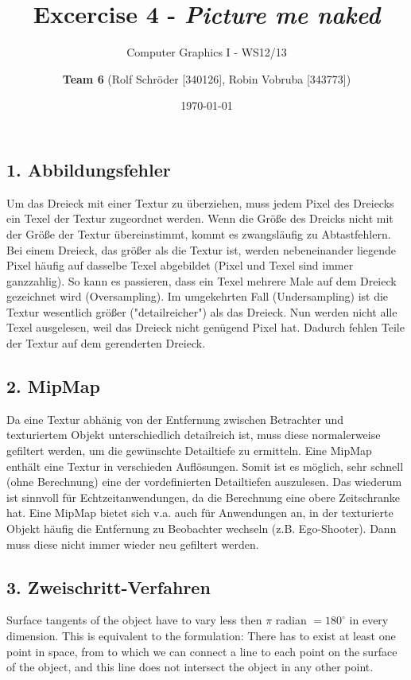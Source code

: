 \documentclass[a4paper,headings=small]{scrartcl}
\title{Excercise 4 - \emph{Picture me naked}}
\subtitle{Computer Graphics I - WS12/13}
\author{\textbf{Team 6} (Rolf Schröder [340126], Robin Vobruba [343773])}
\date{\today}
\numberwithin{equation}{section} %
\numberwithin{figure}{section}   %
\begin{document}
\maketitle

\subsection*{1. Abbildungsfehler}
Um das Dreieck mit einer Textur zu überziehen, muss jedem Pixel des Dreiecks ein Texel der Textur zugeordnet werden.
Wenn die Größe des Dreicks nicht mit der Größe der Textur übereinstimmt, kommt es zwangsläufig zu Abtastfehlern.
Bei einem Dreieck, das größer als die Textur ist, werden nebeneinander liegende Pixel häufig auf dasselbe Texel abgebildet (Pixel und Texel sind immer ganzzahlig).
So kann es passieren, dass ein Texel mehrere Male auf dem Dreieck gezeichnet wird (Oversampling).
Im umgekehrten Fall (Undersampling) ist die Textur wesentlich größer ("detailreicher") als das Dreieck.
Nun werden nicht alle Texel ausgelesen, weil das Dreieck nicht genügend Pixel hat.
Dadurch fehlen Teile der Textur auf dem gerenderten Dreieck.

\subsection*{2. MipMap}
Da eine Textur abhänig von der Entfernung zwischen Betrachter und texturiertem Objekt unterschiedlich detailreich ist, muss diese normalerweise gefiltert werden, um die gewünschte Detailtiefe zu ermitteln.
Eine MipMap enthält eine Textur in verschieden Auflösungen.
Somit ist es möglich, sehr schnell (ohne Berechnung) eine der vordefinierten Detailtiefen auszulesen.
Das wiederum ist sinnvoll für Echtzeitanwendungen, da die Berechnung eine obere Zeitschranke hat.
Eine MipMap bietet sich v.a. auch für Anwendungen an, in der texturierte Objekt häufig die Entfernung zu Beobachter wechseln (z.B. Ego-Shooter).
Dann muss diese nicht immer wieder neu gefiltert werden.

\subsection*{3. Zweischritt-Verfahren}
Surface tangents of the object have to vary less then $\pi$ radian $= 180^{\circ}$ in every dimension.
This is equivalent to the formulation:
There has to exist at least one point in space,
from to which we can connect a line to each point on the surface of the object,
and this line does not intersect the object in any other point.
\end{document}
